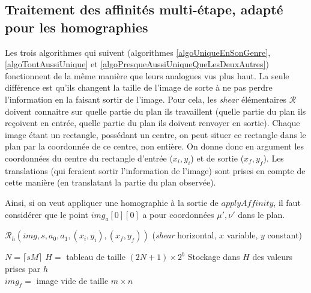   
  \subsection*{Traitement des affinités multi-étape, adapté pour les homographies}
  Les trois algorithmes qui suivent (algorithmes \ref{algoUniqueEnSonGenre}, \ref{algoToutAussiUnique} et \ref{algoPresqueAussiUniqueQueLesDeuxAutres}) fonctionnent de la même manière que leurs analogues vus plus haut. La seule différence est qu'ils changent la taille de l'image de sorte à ne pas perdre l'information en la faisant sortir de l'image. Pour cela, les \emph{shear} élémentaires $\mathcal R$ doivent connaitre sur quelle partie du plan ils travaillent (quelle partie du plan ils reçoivent en entrée, quelle partie du plan ils doivent renvoyer en sortie). Chaque image étant un rectangle, possédant un centre, on peut situer ce rectangle dans le plan par la coordonnée de ce centre, non entière. On donne donc en argument les coordonnées du centre du rectangle d'entrée ($x_i,y_i$) et de sortie ($x_f,y_f$). Les translations (qui feraient sortir l'information de l'image) sont prises en compte de cette manière (en translatant la partie du plan observée).
  
  Ainsi, si on veut appliquer une homographie à la sortie de $applyAffinity$, il faut considérer que le point $img_a[0][0]$ a pour coordonnées $\mu',\nu'$ dans le plan.
  
   \begin{algorithme}
    \label{algoUniqueEnSonGenre}
    \caption{$\mathcal{R}_h(img,s,a_0,a_1,(x_i,y_i),(x_f,y_f))$ (\textit{shear} horizontal, $x$ variable, $y$ constant)}
    $N = \lceil sM \rceil$\;
    $H = $ tableau de taille $(2N+1) \times 2^b$\;
    Stockage dans $H$ des valeurs prises par $h$\;\ \\
    $img_f = $ image vide de taille $m \times n$\;
   \end{algorithme}










